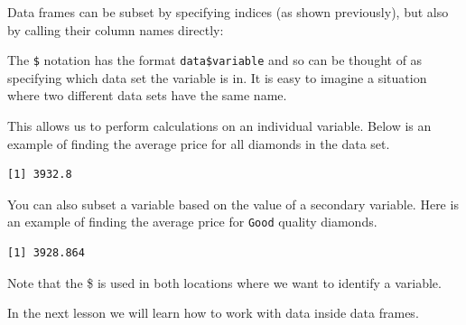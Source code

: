 \documentclass[
  letterpaper,
  DIV=11,
  numbers=noendperiod,
  oneside]{scrreprt}
\newenvironment{Shaded}{\begin{snugshade}}{\end{snugshade}}
\newcommand{\DecValTok}[1]{\textcolor[rgb]{0.68,0.00,0.00}{#1}}
\newcommand{\FunctionTok}[1]{\textcolor[rgb]{0.28,0.35,0.67}{#1}}
\newcommand{\NormalTok}[1]{\textcolor[rgb]{0.00,0.23,0.31}{#1}}
\newcommand{\SpecialCharTok}[1]{\textcolor[rgb]{0.37,0.37,0.37}{#1}}
\newcommand{\StringTok}[1]{\textcolor[rgb]{0.13,0.47,0.30}{#1}}
\begin{document}
Data frames can be subset by specifying indices (as shown previously),
but also by calling their column names directly:

\begin{Shaded}
\end{Shaded}

The \texttt{\$} notation has the format \texttt{data\$variable} and so
can be thought of as specifying which data set the variable is in. It is
easy to imagine a situation where two different data sets have the same
name.

This allows us to perform calculations on an individual variable. Below
is an example of finding the average price for all diamonds in the data
set.

\begin{Shaded}
\end{Shaded}

\begin{verbatim}
[1] 3932.8
\end{verbatim}

You can also subset a variable based on the value of a secondary
variable. Here is an example of finding the average price for
\texttt{Good} quality diamonds.

\begin{Shaded}
\end{Shaded}

\begin{verbatim}
[1] 3928.864
\end{verbatim}

Note that the \$ is used in both locations where we want to identify a
variable.

In the next lesson we will learn how to work with data inside data
frames.
\end{document}
